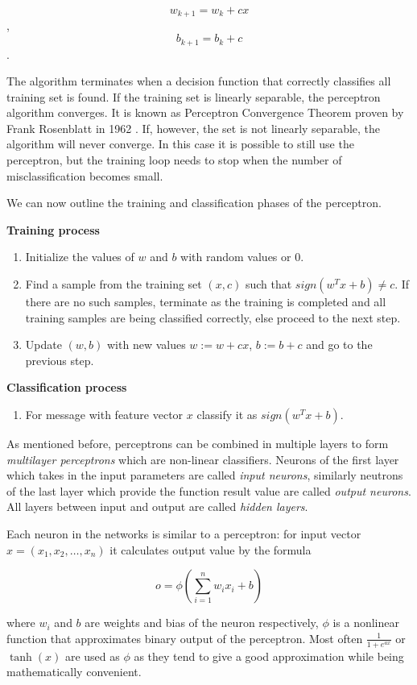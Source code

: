 \documentclass[12pt]{report}
\begin{document}
$$w_{k+1} = w_k + cx$$,
$$b_{k+1} = b_k + c$$.

The algorithm terminates when a decision function that correctly classifies
all training set is found. If the training set is linearly separable, the perceptron algorithm converges. It is known as Perceptron Convergence Theorem proven by Frank Rosenblatt in 1962 \cite{Cristianini}. If, however, the set is not linearly separable, the algorithm will never converge. In this case it is possible to still use the perceptron, but the training loop needs to stop when the number of misclassification becomes small.

We can now outline the training and classification phases of the perceptron.

\textbf{Training process}

\begin{enumerate}
        \item Initialize the values of $w$ and $b$ with random values or 0.
	\item Find a sample from the training set $(x, c)$ such that $sign(w^Tx + b) \ne c$. If there are no such samples, terminate as the training is completed and all training samples are being classified correctly, else proceed to the next step.
	\item Update $(w, b)$ with new values $w := w + cx$, $b := b + c$ and go to the previous step.
\end{enumerate}

\textbf{Classification process}

\begin{enumerate}
	\item For message with feature vector $x$ classify it as $sign(w^Tx + b)$.
\end{enumerate}

As mentioned before, perceptrons can be combined in multiple layers to form \textit{multilayer perceptrons} which are non-linear classifiers. Neurons of the first layer which takes in the input parameters are called \textit{input neurons}, similarly neutrons of the last layer which provide the function result value are called \textit{output neurons}. All layers between input and output are called \textit{hidden layers}.

Each neuron in the networks is similar to a perceptron: for input vector $x = (x_1, x_2, \dots, x_n)$ it calculates output value by the formula

$$o = \phi(\sum_{i = 1}^{n}w_i x_i + b)$$

where $w_i$ and $b$ are weights and bias of the neuron respectively, $\phi$ is a nonlinear function that approximates binary output of the perceptron. Most often $\frac{1}{1 + e^{ax}}$ or $\tanh(x)$ are used as $\phi$ as they tend to give a good approximation while being mathematically convenient.
\end{document}
